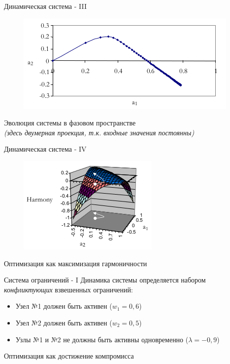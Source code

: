 \documentclass{beamer}
\begin{document}
\begin{frame}{Динамическая система - III}
\begin{center}
	\begin{figure}[H]
		\includegraphics[scale=0.7]{harmonic3.png} 
	\end{figure}
\end{center}
\bigskip
Эволюция системы в фазовом пространстве\\
\textit{(здесь двумерная проекция, т.к. входные значения постоянны)}
\end{frame}

\begin{frame}{Динамическая система - IV}
\begin{center}
	\begin{figure}[H]
		\includegraphics[scale=0.8]{harmonic4.png} 
	\end{figure}
\end{center}
\bigskip
Оптимизация как максимизация гармоничности
\end{frame}

\begin{frame}{Система ограничений - I}
Динамика системы определяется набором \textit{конфликтующих} взвешенных ограничений:\\
\medskip
\begin{itemize}
	\item Узел №1 должен быть активен ($w_1 = 0,6$)
	\medskip
	\item Узел №2 должен быть активен ($w_2 = 0,5$)
	\medskip
	\item Узлы №1 и №2 не должны быть активны одновременно ($\lambda = -0,9$)
\end{itemize}
\bigskip
Оптимизация как достижение компромисса
\end{frame}
\end{document}
